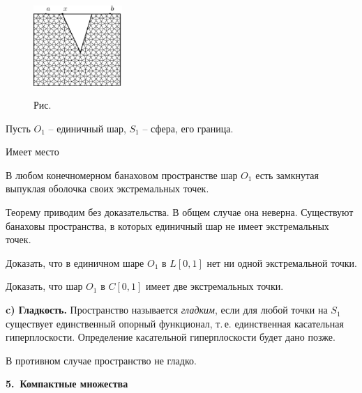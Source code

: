    \vspace{10mm}
\begin{figure}[ht]
\begin{center}
\includegraphics[width=0.3\textwidth]{pict08-4.eps}
\end{center}
 \bigskip
 \label{r8-4}

 \centerline{Рис.~\theris}
 \bigskip
\end{figure}

\vspace{5mm}



 Пусть $O_1$ -- единичный шар, $S_1$ -- сфера, его граница.

 {Имеет место}
 \begin{teo}
 В любом конечномерном банаховом пространстве шар $O_1$ есть
 замкнутая выпуклая оболочка своих экстремальных точек.
 \end{teo}

 Теорему приводим без доказательства. В общем случае она неверна. Существуют банаховы
 пространства, в которых единичный шар не имеет
 экстремальных точек.

 \ex
 Доказать, что в единичном шаре $O_1$  в $L{[0,1]}$ нет ни
 одной  экстремальной точки.

 \ex
 Доказать, что шар $O_1$ в $C[0,1]$ имеет две экстремальных точки.

\vspace{5mm}
 {\bf \normalsize c) Гладкость.}
 Пространство называется {\it гладким}, если для любой
 точки на $S_1$ существует единственный опорный функционал,
 т.\,е. единственная касательная гиперплоскости.
 Определение касательной гиперплоскости будет дано позже.

 В противном случае пространство не гладко.

\vspace{5mm}
 {\bf 5.~Компактные множества}
 \vspace{5mm}

